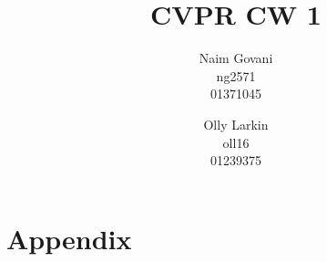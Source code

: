 \documentclass[10pt,twocolumn,letterpaper]{article}
\begin{document}
\title{CVPR CW 1}

\author{Naim Govani\\
ng2571\\
01371045\\
\and
Olly Larkin\\
oll16\\
01239375\\
}

\maketitle








\clearpage

{\small


}

\section{Appendix}
\end{document}
